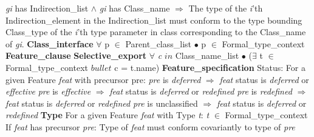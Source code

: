 \indent \indent \indent \indent \indent \textit{gi} has Indirection\_list $\wedge$ \textit{gi} has Class\_name $\Rightarrow$ The type of the \textit{i}'th Indirection\_element \newline
\indent \indent \indent \indent \indent in the Indirection\_list must conform to the type bounding Class\_type of the \textit{i}'th type \newline
\indent \indent \indent \indent \indent parameter in class corresponding to the Class\_name of \textit{gi}.\newline
\textbf{Class\_interface}\newline
\indent $\forall$ p $\in$ Parent\_class\_list $\bullet$ p $\in$ Formal\_type\_context\newline
\indent \textbf{Feature\_clause}\newline
\indent \indent \textbf{Selective\_export}\newline
\indent \indent \indent $\forall$ \textit{c} $in$ Class\_name\_list $\bullet$ ($\exists$ t $\in$ Formal\_type\_context $bullet$ c = t.name)\newline
\indent \textbf{Feature\_specification}\newline
\indent \indent Status:\newline
\indent For a given Feature \textit{feat} with precursor {pre}:\newline
\indent \indent \textit{pre} is \textit{deferred} $\Rightarrow$ \textit{feat} status is \textit{deferred} or \textit{effective}\newline
\indent \indent \textit{pre} is \textit{effective} $\Rightarrow$ \textit{feat} status is \textit{deferred} or \textit{redefined} \newline
\indent \indent \textit{pre} is \textit{redefined} $\Rightarrow$ \textit{feat} status is \textit{deferred} or \textit{redefined}\newline
\indent \indent \textit{pre} is unclassified $\Rightarrow$ \textit{feat} status is \textit{deferred} or \textit{redefined}\newline
\textbf{Type}\newline
\indent For a given Feature \textit{feat} with Type \textit{t}:\newline
\indent \indent \textit{t} $\in$ Formal\_type\_context\newline
\indent If \textit{feat} has precursor \textit{pre}:\newline
\indent \indent Type of \textit{feat} must conform covariantly to type of \textit{pre}\newline
